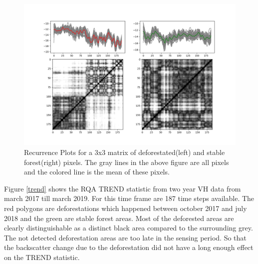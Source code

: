 \documentclass{article}
\begin{document}
\begin{figure}
  \includegraphics[width=\textwidth]{figs/S1_Hidalgo_timestack_20km_VH___lin_20_test_tandemdem12_emd__rp_deffor_3.png}
  \caption{Recurrence Plots for a 3x3 matrix of deforestated(left) and stable forest(right) pixels.
           The gray lines in the above figure are all pixels and the colored line is the mean of these pixels.}
  \label{rpforest}
\end{figure}

Figure \ref{trend} shows the RQA TREND statistic from two year VH data from march 2017 till march 2019.
For this time frame are 187 time steps available.
The red polygons are deforestations which happened between october 2017 and july 2018 and the green are stable forest areas.
Most of the deforested areas are clearly distinguishable as a distinct black area compared to the surrounding grey.
The not detected deforestation areas are too late in the sensing period.
So that the backscatter change due to the deforestation did not have a long enough effect on the TREND statistic.
\end{document}
